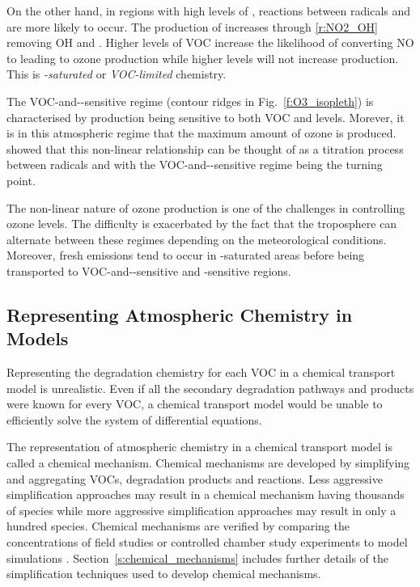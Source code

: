\newpage
On the other hand, in regions with high levels of , reactions between radicals and  are more likely to occur.
The production of  increases through \eqref{r:NO2_OH} removing OH and .
Higher levels of VOC increase the likelihood of  converting NO to  leading to ozone production while higher  levels will not increase  production.  
This is \emph{-saturated} or \emph{VOC-limited} chemistry.

The VOC-and--sensitive regime (contour ridges in Fig.~\ref{f:O3_isopleth}) is characterised by  production being sensitive to both VOC and  levels. 
Morever, it is in this atmospheric regime that the maximum amount of ozone is produced.
\citet{Kleinman:1994} showed that this non-linear relationship can be thought of as a titration process between radicals and  with the VOC-and--sensitive regime being the turning point.

The non-linear nature of ozone production is one of the challenges in controlling ozone levels.
The difficulty is exacerbated by the fact that the troposphere can alternate between these regimes depending on the meteorological conditions.
Moreover, fresh emissions tend to occur in -saturated areas before being transported to VOC-and--sensitive and -sensitive regions.

\subsection{Representing Atmospheric Chemistry in Models} \label{ss:chemistry_models}
Representing the degradation chemistry for each VOC in a chemical transport model is unrealistic.
Even if all the secondary degradation pathways and products were known for every VOC, a chemical transport model would be unable to efficiently solve the system of differential equations.

The representation of atmospheric chemistry in a chemical transport model is called a chemical mechanism.
Chemical mechanisms are developed by simplifying and aggregating VOCs, degradation products and reactions.
Less aggressive simplification approaches may result in a chemical mechanism having thousands of species while more aggressive simplification approaches may result in only a hundred species. 
Chemical mechanisms are verified by comparing the concentrations of field studies or controlled chamber study experiments to model simulations \citep{Stockwell:2012}.
Section~\ref{s:chemical_mechanisms} includes further details of the simplification techniques used to develop chemical mechanisms.

